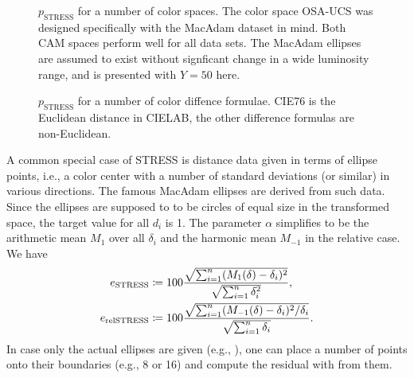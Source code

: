 \documentclass{scrartcl}
\theoremstyle{named}
\begin{document}
\begin{figure}
\centering

\caption{$p_\text{STRESS}$ for a number of color spaces. The color space OSA-UCS was
designed specifically with the MacAdam \cite{macadam1974} dataset in mind. Both CAM
spaces perform well for all data sets. The MacAdam ellipses are assumed to exist without
  signficant change in a wide luminosity range, and is presented with $Y=50$ here.}
\end{figure}

\begin{figure}
\centering
  
  \caption{$p_\text{STRESS}$ for a number of color diffence formulae.  CIE76 is the
  Euclidean distance in CIELAB, the other difference formulas are non-Euclidean.}
\end{figure}

A common special case of STRESS is distance data given in terms of ellipse points,
i.e., a color center with a number of standard deviations (or similar) in various
directions. The famous MacAdam ellipses \cite{macadam1942} are derived from such data.
Since the ellipses are supposed to to be circles of equal size in the transformed space,
the target value for all $d_i$ is 1. The parameter $\alpha$ simplifies to be the
arithmetic mean $M_1$ over all $\delta_i$ and the harmonic mean $M_{-1}$ in the
relative case. We have
\begin{align}\label{eq:e}
  e_{\text{STRESS}}
  &\coloneqq
  100
  \frac{%
    \sqrt{\sum_{i=1}^n (M_1(\delta) - \delta_{i})^2}
  }{
    \sqrt{\sum_{i=1}^n \delta_i^2}
  },
  \\
  \nonumber
  e_{\text{relSTRESS}}
  &\coloneqq
  100
  \frac{%
    \sqrt{\sum_{i=1}^n (M_{-1}(\delta) - \delta_{i})^2 / \delta_i}
  }{
    \sqrt{\sum_{i=1}^n \delta_i}
  }.
\end{align}
In case only the actual ellipses are given (e.g., \cite{luorigg}), one can place a
number of points onto their boundaries (e.g., 8 or 16) and compute the residual with
from them.
\end{document}
